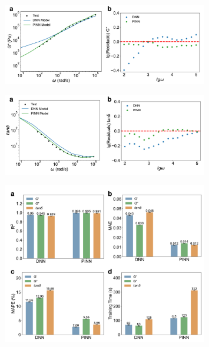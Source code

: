 \begin{figure}[htbp]
  \centering
  \includegraphics[width=0.8\textwidth]{Fig/pba-g2.pdf}
\end{figure}

\begin{figure}[htbp]
  \centering
  \includegraphics[width=0.8\textwidth]{Fig/pba-lossf.pdf}
\end{figure}

\begin{figure}[htbp]
  \centering
  \includegraphics[width=0.8\textwidth]{Fig/pba-metrics.pdf}
\end{figure}
